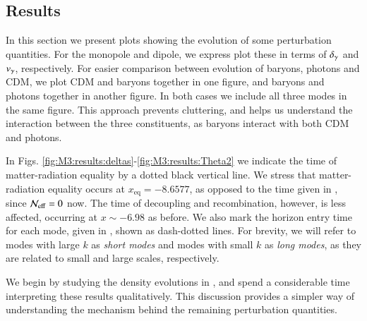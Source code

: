 \subsection{Results}\label{ssec:M3:results}

In this section we present plots showing the evolution of some perturbation quantities. For the monopole and dipole, we express plot these in terms of $\delta_\gamma$ and $v_\gamma$, respectively. For easier comparison between evolution of baryons, photons and CDM, we plot CDM and baryons together in one figure, and baryons and photons together in another figure. In both cases we include all three modes in the same figure. This approach prevents cluttering, and helps us understand the interaction between the three constituents, as baryons interact with both CDM and photons. 

In Figs. \ref{fig:M3:results:deltas}-\ref{fig:M3:results:Theta2} we indicate the time of matter-radiation equality by a dotted black vertical line. We stress that matter-radiation equality occurs at $x_\mathrm{eq}=-8.6577$, as opposed to the time given in , since $\mathcal{N}_\mathrm{eff}=0$ now. The time of decoupling and recombination, however, is less affected, occurring at $x\sim-6.98$ as before. We also mark the horizon entry time for each mode, given in , shown as dash-dotted lines. For brevity, we will refer to modes with large $k$ as \textit{short modes} and modes with small $k$ as \textit{long modes}, as they are related to small and large scales, respectively. 

We begin by studying the density evolutions in , and spend a considerable time interpreting these results qualitatively. This discussion provides a simpler way of understanding the mechanism behind the remaining perturbation quantities.

